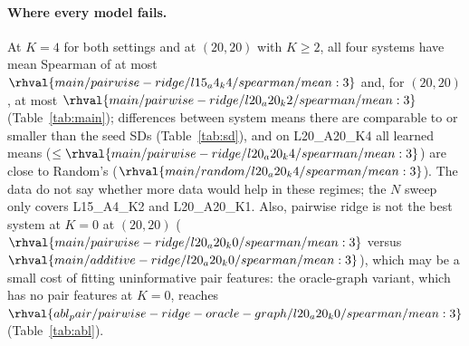 \paragraph{Where every model fails.} At $K=4$ for both settings and at $(20,20)$ with $K\ge2$, all four systems have mean Spearman of at most $\rhval{main/pairwise-ridge/l15_a4_k4/spearman/mean:3}$ and, for $(20,20)$, at most $\rhval{main/pairwise-ridge/l20_a20_k2/spearman/mean:3}$ (Table~\ref{tab:main}); differences between system means there are comparable to or smaller than the seed SDs (Table~\ref{tab:sd}), and on L20\_A20\_K4 all learned means ($\le\rhval{main/pairwise-ridge/l20_a20_k4/spearman/mean:3}$) are close to Random's ($\rhval{main/random/l20_a20_k4/spearman/mean:3}$). The data do not say whether more data would help in these regimes; the $N$ sweep only covers L15\_A4\_K2 and L20\_A20\_K1. Also, pairwise ridge is not the best system at $K=0$ at $(20,20)$ ($\rhval{main/pairwise-ridge/l20_a20_k0/spearman/mean:3}$ versus $\rhval{main/additive-ridge/l20_a20_k0/spearman/mean:3}$), which may be a small cost of fitting uninformative pair features: the oracle-graph variant, which has no pair features at $K=0$, reaches $\rhval{abl_pair/pairwise-ridge-oracle-graph/l20_a20_k0/spearman/mean:3}$ (Table~\ref{tab:abl}).
